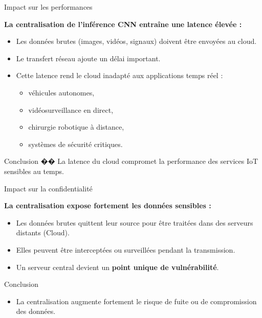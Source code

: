\documentclass{beamer}
\begin{document}
\begin{frame}{Impact sur les performances}

\textbf{La centralisation de l'inférence CNN entraîne une latence élevée :}

\begin{itemize}
    \item Les données brutes (images, vidéos, signaux) doivent être envoyées au cloud.
    \item Le transfert réseau ajoute un délai important.
    \item Cette latence rend le cloud inadapté aux applications temps réel :
    \begin{itemize}
        \item véhicules autonomes,
        \item vidéosurveillance en direct,
        \item chirurgie robotique à distance,
        \item systèmes de sécurité critiques.
    \end{itemize}
\end{itemize}

\begin{block}{Conclusion}
�� La latence du cloud compromet la performance des services IoT sensibles au temps.
\end{block}

\end{frame}

\begin{frame}{Impact sur la confidentialité}

\textbf{La centralisation expose fortement les données sensibles :}

\begin{itemize}
    \item Les données brutes quittent leur source pour être traitées dans des serveurs distants (Cloud).
    \item Elles peuvent être interceptées ou surveillées pendant la transmission.
    \item Un serveur central devient un \textbf{point unique de vulnérabilité}.
\end{itemize}

\begin{block}{Conclusion}
\begin{itemize}
    \item La centralisation augmente fortement le risque de fuite ou de compromission des données.
\end{itemize}
\end{block}

\end{frame}
\end{document}
